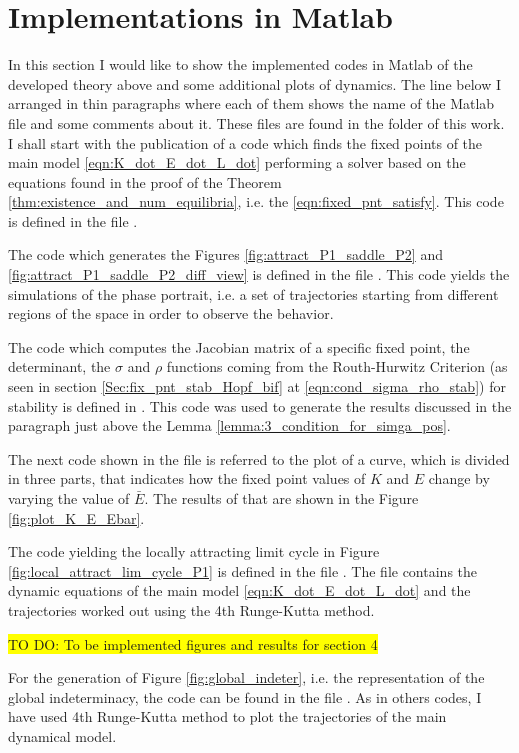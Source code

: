 \section{Implementations in Matlab}\label{app:A}
In this section I would like to show the implemented codes in Matlab of the developed theory above and some additional plots of dynamics. The line below I arranged in thin paragraphs where each of them shows the name of the Matlab file and some comments about it. These files are found in the folder of this work.\\
I shall start with the publication of a code which finds the fixed points of the main model \eqref{eqn:K_dot_E_dot_L_dot} performing a solver based on the equations found in the proof of the Theorem \ref{thm:existence_and_num_equilibria}, i.e. the \eqref{eqn:fixed_pnt_satisfy}. This code is defined in the file . 

The code which generates the Figures \ref{fig:attract_P1_saddle_P2} and \ref{fig:attract_P1_saddle_P2_diff_view} is defined in the file . This code yields the simulations of the phase portrait, i.e. a set of trajectories starting from different regions of the space in order to observe the behavior. 

The code which computes the Jacobian matrix of a specific fixed point, the determinant, the $\sigma$ and $\rho$ functions coming from the Routh-Hurwitz Criterion (as seen in section \ref{Sec:fix_pnt_stab_Hopf_bif} at \eqref{eqn:cond_sigma_rho_stab}) for stability is defined in . This code was used to generate the results discussed in the paragraph just above the Lemma \ref{lemma:3_condition_for_simga_pos}.

The next code shown in the file  is referred to the plot of a curve, which is divided in three parts, that indicates how the fixed point values of $K$ and $E$ change by varying the value of $\bar{E}$. The results of that are shown in the Figure \ref{fig:plot_K_E_Ebar}.

The code yielding the locally attracting limit cycle in Figure \ref{fig:local_attract_lim_cycle_P1} is defined in the file . The file contains the dynamic equations of the main model \eqref{eqn:K_dot_E_dot_L_dot} and the trajectories worked out using the 4th Runge-Kutta method.

\colorbox{yellow}{TO DO: To be implemented figures and results for section 4}

For the generation of Figure \ref{fig:global_indeter}, i.e. the representation of the global indeterminacy, the code can be found in the file . As in others codes, I have used 4th Runge-Kutta method to plot the trajectories of the main dynamical model.